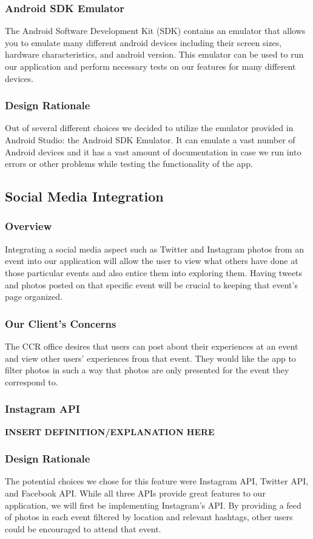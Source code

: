 \documentclass[draftclsnofoot, onecolumn, 10pt, compsoc]{IEEEtran}
\begin{document}
			\subsubsection{Android SDK Emulator}
				The Android Software Development Kit (SDK) contains an emulator that allows you to emulate many different android devices including their screen sizes, hardware characteristics, and android version. This emulator can be used to run our application and perform necessary tests on our features for many different devices.
				~\cite{Android_SDK_Emulator}
			\subsubsection{Design Rationale}
				Out of several different choices we decided to utilize the emulator provided in Android Studio: the Android SDK Emulator. It can emulate a vast number of Android devices and it has a vast amount of documentation in case we run into errors or other problems while testing the functionality of the app.
				~\cite{Android_SDK_Emulator}
		\subsection{Social Media Integration}
			\subsubsection{Overview}
				Integrating a social media aspect such as Twitter and Instagram photos from an event into our application will allow the user to view what others have done at those particular events and also entice them into exploring them. Having tweets and photos posted on that specific event will be crucial to keeping that event's page organized. 
			\subsubsection{Our Client's Concerns}
				The CCR office desires that users can post about their experiences at an event and view other users' experiences from that event. They would like the app to filter photos in such a way that photos are only presented for the event they correspond to.
			\subsubsection{Instagram API}
				\textbf{INSERT DEFINITION/EXPLANATION HERE}
				~\cite{InstaAPI}
			\subsubsection{Design Rationale}
				The potential choices we chose for this feature were Instagram API, Twitter API, and Facebook API. While all three APIs provide great features to our application, we will first be implementing Instagram's API. By providing a feed of photos in each event filtered by location and relevant hashtags, other users could be encouraged to attend that event.
\end{document}
